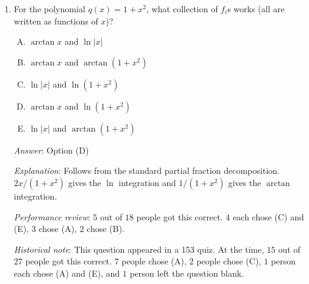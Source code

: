 \documentclass[10pt]{amsart}
\begin{document}
\begin{enumerate}
  {\em Answer}: Option (E)

  {\em Explanation}: This can be justified in terms of partial
  fractions. Th ecase where $q$ is a product of linear factors can be
  justified using the previous question. But that is not the most
  elegant justification. When we cover sequences and series, we will
  see some comparison tests that make it clear why this holds. The
  basic example you can keep in mind is that the antiderivative of
  $1/x^2$ is $-1/x$, which has a finite limit as $x \to \infty$.

  {\em Performance review}: $3$ out of $18$ people got this
  correct. $7$ chose (D), $5$ chose (B), $2$ chose (C), $1$ chose (A).

  Those who chose (D) had the right idea but failed to account for the
  extra margin that needs to be maintained because an integration is
  being performed.

  {\em Historical note}: This question appeared
  in a 153 quiz. At the time, $3$ out of $27$ people got this
  correct. $10$ people chose (D), $7$ people chose (C), $6$ people
  chose (B), and $1$ person chose (A).



  For the final question, build on the observation: For any
  nonconstant monic polynomial $q(x)$, there exists a finite
  collection of transcendental functions $f_1, f_2, \dots, f_r$ such
  that the antiderivative of any rational function $p(x)/q(x)$, on an
  open interval where it is defined and continuous, can be expressed
  as $g_0 + f_1g_1 + f_2g_2 + \dots + f_rg_r$ where $g_0, g_1, \dots,
  g_r$ are rational functions.

\item For the polynomial $q(x) = 1 + x^2$, what collection of $f_i$s
  works (all are written as functions of $x$)?

  \begin{enumerate}[(A)]
  \item $\arctan x$ and $\ln|x|$
  \item $\arctan x$ and $\arctan(1 + x^2)$
  \item $\ln|x|$ and $\ln(1 + x^2)$ 
  \item $\arctan x$ and $\ln(1 + x^2)$
  \item $\ln|x|$ and $\arctan(1 + x^2)$
  \end{enumerate}

  {\em Answer}: Option (D)

  {\em Explanation}: Follows from the standard partial fraction
  decomposition. $2x/(1 + x^2)$ gives the $\ln$ integration and $1/(1
  + x^2)$ gives the $\arctan$ integration.

  {\em Performance review}: $5$ out of $18$ people got this
  correct. $4$ each chose (C) and (E), $3$ chose (A), $2$ chose (B).

  {\em Historical note}: This question appeared in a 153 quiz. At the
  time, $15$ out of $27$ people got this correct. $7$ people chose
  (A), $2$ people chose (C), $1$ person each chose (A) and (E), and
  $1$ person left the question blank.

\end{enumerate}
\end{document}
